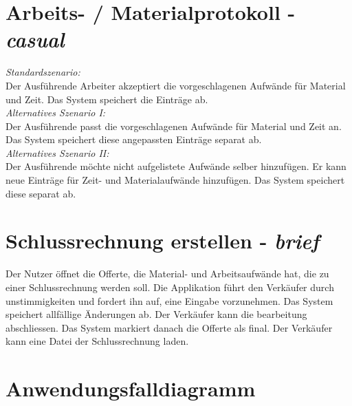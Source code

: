 \documentclass[journal]{combine}
\begin{document}
	\newpage
	\section{Arbeits- / Materialprotokoll  - \emph{casual}}
		\emph{Standardszenario:} \\
		Der Ausführende Arbeiter akzeptiert die vorgeschlagenen Aufwände für Material
		und Zeit. Das System speichert die Einträge ab.\\
		\emph{Alternatives Szenario I:}\\
		Der Ausführende passt die vorgeschlagenen Aufwände für Material und Zeit an.
		Das System speichert diese angepassten Einträge separat ab.\\	
		\emph{Alternatives Szenario II:}\\
		Der Ausführende möchte nicht aufgelistete Aufwände selber hinzufügen. Er kann neue
		Einträge für Zeit- und Materialaufwände hinzufügen. Das System speichert diese separat ab.
	\newpage
	\section{Schlussrechnung erstellen - \emph{brief}}
		Der Nutzer öffnet die Offerte, die Material- und Arbeitsaufwände hat,
		die zu einer Schlussrechnung werden soll. Die Applikation führt den Verkäufer durch
		unstimmigkeiten und fordert ihn auf, eine Eingabe vorzunehmen. Das System
		speichert allfällige Änderungen ab. Der Verkäufer kann die bearbeitung abschliessen.
		Das System markiert danach die Offerte als final. Der Verkäufer kann eine Datei der 
		Schlussrechnung laden.

	\newpage
	\section{Anwendungsfalldiagramm}
\end{document}
